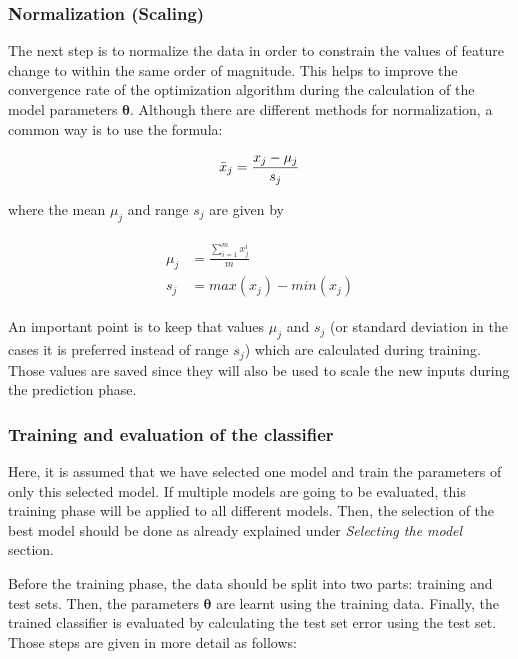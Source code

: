  \subsubsection{Normalization (Scaling)}

The next step is to normalize the data in order to constrain the values of feature change to within the same order of magnitude. 
This helps to improve the convergence rate of the optimization algorithm during the calculation of the model parameters $\bm{\theta}$.  
Although there are different methods for normalization, a common way is to use the formula:

\begin{equation}{\label{eqn:scalingFeatures}}
\bar{x}_j = \frac{x_j - \mu_j}{s_j} 
\end{equation} 

where the mean $\mu_j$ and range $s_j$ are given by

\begin{align}
\label{eqn:meandAndRange}
\begin{split}
\mu_j & = \frac{\sum\limits_{i=1}^m {x_j^i} }{m}
\\
s_j & = max(x_j) - min(x_j)
\end{split}
\end{align}

An important point is to keep that values $\mu_j$ and $s_j$ (or standard deviation in the cases it is preferred instead of range $s_j$) which are calculated during training. 
Those values are saved since they will also be used to scale the new inputs during the prediction phase.


\subsubsection{Training and evaluation of the classifier}  %

Here, it is assumed that we have selected one model and train the parameters of only this selected model. 
If multiple models are going to be evaluated, this training phase will be applied to all different models. 
Then, the selection of the best model should be done as already explained under \emph{Selecting the model} section.  

Before the training phase, the data should be split into two parts: training and test sets.
Then, the parameters $\bm{\theta}$ are learnt using the training data. 
Finally, the trained classifier is evaluated by calculating the test set error using the test set.
Those steps are given in more detail as follows:
 
